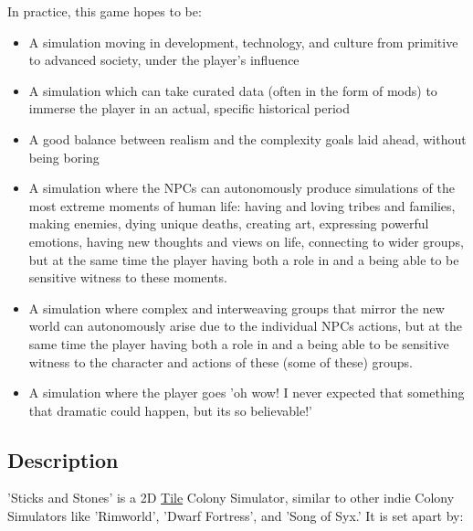 \documentclass[11pt]{article}
\begin{document}
In practice, this game hopes to be:\\
\begin{itemize}
\item A simulation moving in development, technology, and culture from primitive to advanced society, under the player's influence\\
\item A simulation which can take curated data (often in the form of mods) to immerse the player in an actual, specific historical period\\
\item A good balance between realism and the complexity goals laid ahead, without being boring\\
\item A simulation where the NPCs can autonomously produce simulations of the most extreme moments of human life: having and loving tribes and families, making enemies, dying unique deaths, creating art, expressing powerful emotions, having new thoughts and views on life, connecting to wider groups, but at the same time the player having both a role in and a being able to be sensitive witness to these moments.\\
\item A simulation where complex and interweaving groups that mirror the new world can autonomously arise due to the individual NPCs actions, but at the same time the player having both a role in and a being able to be sensitive witness to the character and actions of these (some of these) groups.\\
\item A simulation where the player goes 'oh wow! I never expected that something that dramatic could happen, but its so believable!'\\
\end{itemize}
\subsection{Description}
\label{sec:org31bd3ab}
'Sticks and Stones' is a 2D \hyperref[org938ee1c]{Tile} Colony Simulator, similar to other indie Colony Simulators like 'Rimworld', 'Dwarf Fortress', and 'Song of Syx.' It is set apart by:\\
\end{document}
